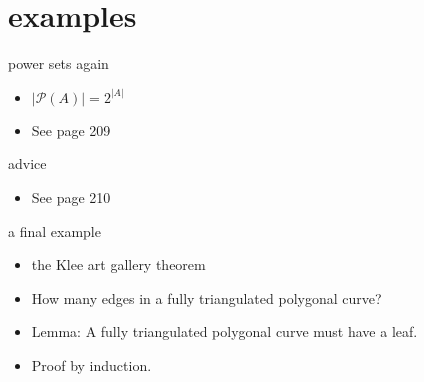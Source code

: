 \documentclass[handout,landscape]{beamer}
\begin{document}
\section{examples}

\begin{frame}{power sets again}
\begin{itemize}
\item $|{\mathcal P}(A)| = 2^{|A|}$ \pause
\item See page 209
\end{itemize}
\end{frame}

\begin{frame}{advice}
\begin{itemize}
\item See page 210
\end{itemize}
\end{frame}

\begin{frame}{a final example}
\begin{itemize}
\item the Klee art gallery theorem\pause
\item How many edges in a fully triangulated polygonal curve? \pause
\item Lemma: A fully triangulated polygonal curve must have a leaf. \pause
\item Proof by induction.
\end{itemize}
\end{frame}
\end{document}
